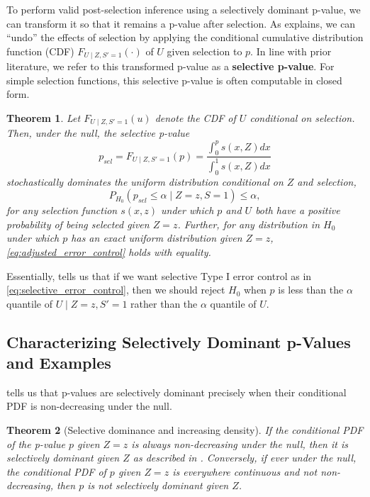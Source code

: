 \documentclass{article}
\newtheorem{theorem}{Theorem}
\begin{document}
To perform valid post-selection inference using a selectively dominant p-value, we can transform it so that it remains a p-value after selection. As  explains, we can ``undo'' the effects of selection by applying the conditional cumulative distribution function (CDF) $F_{U \mid Z, S' = 1}(\cdot)$ of $U$ given selection to $p$. In line with prior literature, we refer to this transformed p-value as a \textbf{selective p-value}. For simple selection functions, this selective p-value is often computable in closed form. 

\begin{theorem}
    \label{thm:adjustment}
    Let  $F_{U \mid Z, S '= 1}(u)$ denote the CDF of $U$ conditional on selection. Then, under the null, the selective p-value 
    \begin{equation}
    \label{eq:adjustment}
        p_{sel} = F_{U \mid Z, S' = 1}(p) = \frac{\int_0^p s(x, Z) dx}{\int_0^1 s(x, Z) dx}
    \end{equation}
    stochastically dominates the uniform distribution conditional on $Z$ and selection,
    \begin{equation}
        \label{eq:adjusted_error_control}
        P_{H_0}(p_{sel} \leq \alpha \mid Z=z, S= 1) \leq \alpha, 
    \end{equation}
    for any selection function $s(x, z)$ under which $p$ and $U$ both have a positive probability of being selected given $Z=z$. Further, for any distribution in $H_0$ under which $p$ has an exact uniform distribution given $Z=z$, \eqref{eq:adjusted_error_control} holds with equality. 
\end{theorem}

Essentially,  tells us that if we want selective Type I error control as in \eqref{eq:selective_error_control}, then we should reject $H_0$ when $p$ is less than the $\alpha$ quantile of $U \mid Z=z, S' = 1$ rather than the $\alpha$ quantile of $U$. 

\subsection{Characterizing Selectively Dominant p-Values and Examples}

 tells us that p-values are selectively dominant precisely when their conditional PDF is non-decreasing under the null. 

\begin{theorem}[Selective dominance and increasing density]
    \label{thm:density}
    If the conditional PDF of the p-value $p$ given $Z=z$ is always non-decreasing under the null, then it is selectively dominant given $Z$ as described in . Conversely, if ever under the null, the conditional PDF of $p$ given $Z=z$ is everywhere continuous and not non-decreasing, then $p$ is not selectively dominant given $Z$.  
\end{theorem}
\end{document}
